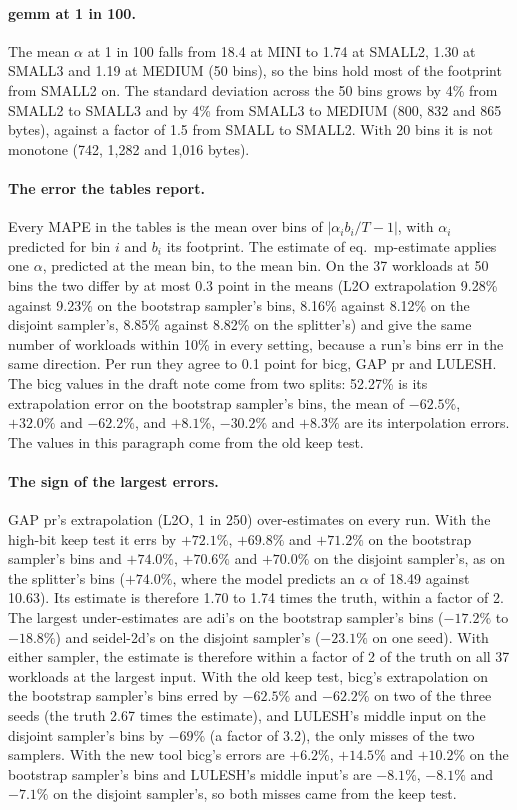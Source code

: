 \documentclass[11pt]{article}
\begin{document}
\paragraph{gemm at 1 in 100.} The mean $\alpha$ at 1 in 100 falls from 18.4 at MINI to 1.74 at SMALL2, 1.30 at SMALL3
and 1.19 at MEDIUM (50 bins), so the bins hold most of the footprint from SMALL2 on. The standard deviation across
the 50 bins grows by 4\% from SMALL2 to SMALL3 and by 4\% from SMALL3 to MEDIUM (800, 832 and 865 bytes), against a
factor of 1.5 from SMALL to SMALL2. With 20 bins it is not monotone (742, 1{,}282 and 1{,}016 bytes).

\paragraph{The error the tables report.} Every MAPE in the tables is the mean over bins of $|\alpha_i b_i / T - 1|$,
with $\alpha_i$ predicted for bin $i$ and $b_i$ its footprint. The estimate of eq.\ mp-estimate applies one $\alpha$,
predicted at the mean bin, to the mean bin. On the 37 workloads at 50 bins the two differ by at most 0.3 point in the
means (L2O extrapolation 9.28\% against 9.23\% on the bootstrap sampler's bins, 8.16\% against 8.12\% on the disjoint
sampler's, 8.85\% against 8.82\% on the splitter's) and give the same number of workloads within 10\% in every
setting, because a run's bins err in the same direction. Per run they agree to 0.1 point for bicg, GAP pr and LULESH.
The bicg values in the draft note come from two splits: 52.27\% is its extrapolation error on the bootstrap sampler's
bins, the mean of $-62.5\%$, $+32.0\%$ and $-62.2\%$, and $+8.1\%$, $-30.2\%$ and $+8.3\%$ are its interpolation errors.
The values in this paragraph come from the old keep test.

\paragraph{The sign of the largest errors.} GAP pr's extrapolation (L2O, 1 in 250) over-estimates on every run. With
the high-bit keep test it errs by $+72.1\%$, $+69.8\%$ and $+71.2\%$ on the bootstrap sampler's bins and $+74.0\%$,
$+70.6\%$ and $+70.0\%$ on the disjoint sampler's, as on the splitter's bins ($+74.0\%$, where the model predicts
an $\alpha$ of 18.49 against 10.63). Its estimate is therefore 1.70 to 1.74 times the truth, within a factor of 2.
The largest under-estimates are adi's on the bootstrap sampler's bins ($-17.2\%$ to $-18.8\%$) and seidel-2d's on
the disjoint sampler's ($-23.1\%$ on one seed). With either sampler, the estimate is therefore within a factor of 2
of the truth on all 37 workloads at the largest input. With the old keep test, bicg's extrapolation on the bootstrap
sampler's bins erred by $-62.5\%$ and $-62.2\%$ on two of the three seeds (the truth 2.67 times the estimate), and
LULESH's middle input on the disjoint sampler's bins by $-69\%$ (a factor of 3.2), the only misses of the two
samplers. With the new tool bicg's errors are $+6.2\%$, $+14.5\%$ and $+10.2\%$ on the bootstrap sampler's bins
and LULESH's middle input's are $-8.1\%$, $-8.1\%$ and $-7.1\%$ on the disjoint sampler's, so both misses came
from the keep test.
\end{document}
